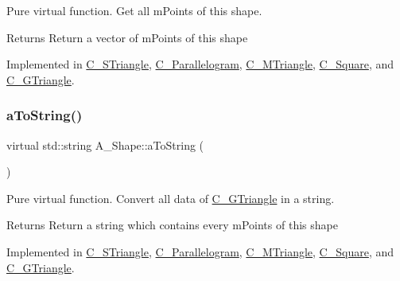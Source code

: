 Pure virtual function. Get all m\+Points of this shape. 

\begin{DoxyReturn}{Returns}
Return a vector of m\+Points of this shape 
\end{DoxyReturn}


Implemented in \hyperlink{classC__STriangle_a431802d5e10b69f535e7929a23963b5e}{C\+\_\+\+S\+Triangle}, \hyperlink{classC__Parallelogram_adfe1c40f2d33955617e3a535c548dfa0}{C\+\_\+\+Parallelogram}, \hyperlink{classC__MTriangle_a5a3971eb0aafc16e5a34bd94130d7c6b}{C\+\_\+\+M\+Triangle}, \hyperlink{classC__Square_a295a170686422b745587a250ebe08a5e}{C\+\_\+\+Square}, and \hyperlink{classC__GTriangle_a18c134ddf90bc4f5729064a47094068b}{C\+\_\+\+G\+Triangle}.

\mbox{\label{classA__Shape_ad8804b4e74543db374af6892367b7c2e}} 
\subsubsection{\texorpdfstring{a\+To\+String()}{aToString()}}
{\footnotesize\ttfamily virtual std\+::string A\+\_\+\+Shape\+::a\+To\+String (\begin{DoxyParamCaption}{ }\end{DoxyParamCaption})\hspace{0.3cm}{\ttfamily [pure virtual]}}



Pure virtual function. Convert all data of \hyperlink{classC__GTriangle}{C\+\_\+\+G\+Triangle} in a string. 

\begin{DoxyReturn}{Returns}
Return a string which contains every m\+Points of this shape 
\end{DoxyReturn}


Implemented in \hyperlink{classC__STriangle_a1ea089f6a82c2770e0529c4a9fc07d90}{C\+\_\+\+S\+Triangle}, \hyperlink{classC__Parallelogram_add67ef2aba5e14c27e30a958e4843223}{C\+\_\+\+Parallelogram}, \hyperlink{classC__MTriangle_a3a769eb21278ec456292d88385b332a2}{C\+\_\+\+M\+Triangle}, \hyperlink{classC__Square_ab2cada51b25cd35b9a79e461767e56f0}{C\+\_\+\+Square}, and \hyperlink{classC__GTriangle_aa432e8b8320db8a53ef1d59b486ed7ce}{C\+\_\+\+G\+Triangle}.

\mbox{\label{classA__Shape_a2c663e21cf31002323b83f9f98234d33}} 
